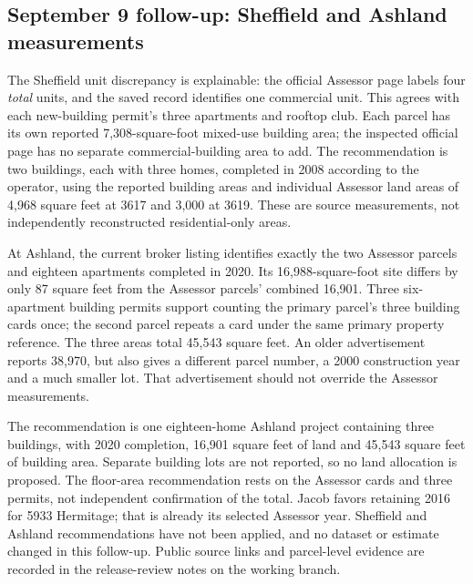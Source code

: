 \clearpage
\subsection*{September 9 follow-up: Sheffield and Ashland measurements}
The Sheffield unit discrepancy is explainable: the official Assessor page labels four \emph{total} units, and the saved record identifies one commercial unit. This agrees with each new-building permit's three apartments and rooftop club. Each parcel has its own reported 7,308-square-foot mixed-use building area; the inspected official page has no separate commercial-building area to add. The recommendation is two buildings, each with three homes, completed in 2008 according to the operator, using the reported building areas and individual Assessor land areas of 4,968 square feet at 3617 and 3,000 at 3619. These are source measurements, not independently reconstructed residential-only areas.

At Ashland, the current broker listing identifies exactly the two Assessor parcels and eighteen apartments completed in 2020. Its 16,988-square-foot site differs by only 87 square feet from the Assessor parcels' combined 16,901. Three six-apartment building permits support counting the primary parcel's three building cards once; the second parcel repeats a card under the same primary property reference. The three areas total 45,543 square feet. An older advertisement reports 38,970, but also gives a different parcel number, a 2000 construction year and a much smaller lot. That advertisement should not override the Assessor measurements.

The recommendation is one eighteen-home Ashland project containing three buildings, with 2020 completion, 16,901 square feet of land and 45,543 square feet of building area. Separate building lots are not reported, so no land allocation is proposed. The floor-area recommendation rests on the Assessor cards and three permits, not independent confirmation of the total. Jacob favors retaining 2016 for 5933 Hermitage; that is already its selected Assessor year. Sheffield and Ashland recommendations have not been applied, and no dataset or estimate changed in this follow-up. Public source links and parcel-level evidence are recorded in the release-review notes on the working branch.
